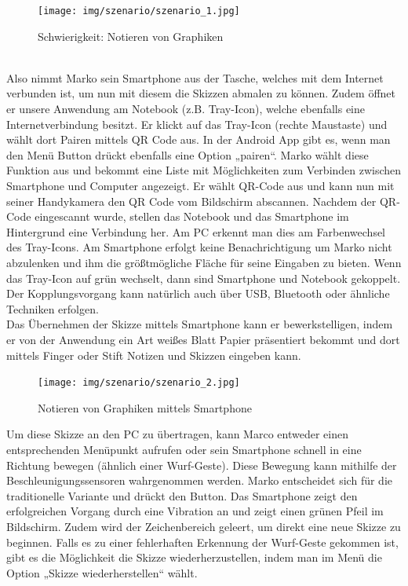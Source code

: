 \documentclass{chi-ext}
\begin{document}
\begin{figure}
  \centering
  \texttt{[image: img/szenario/szenario\_1.jpg]}
  \caption{Schwierigkeit: Notieren von Graphiken}
  \label{fig:mockup_startscreen}
\end{figure}
\ \\[3em]
Also nimmt Marko sein Smartphone aus der Tasche, welches mit dem Internet verbunden ist, um nun mit diesem die Skizzen abmalen zu können. Zudem öffnet er unsere Anwendung am Notebook (z.B. Tray-Icon), welche ebenfalls eine Internetverbindung besitzt. Er klickt auf das Tray-Icon (rechte Maustaste) und wählt dort Pairen mittels QR Code aus. In der Android App gibt es, wenn man den Menü Button drückt ebenfalls eine Option „pairen“. Marko wählt diese Funktion aus und bekommt eine Liste mit Möglichkeiten zum Verbinden zwischen Smartphone und Computer angezeigt. Er wählt QR-Code aus und kann nun mit seiner Handykamera den QR Code vom Bildschirm abscannen. Nachdem der QR-Code eingescannt wurde, stellen das Notebook und das Smartphone im Hintergrund eine Verbindung her. Am PC erkennt man dies am Farbenwechsel des Tray-Icons. Am Smartphone erfolgt keine Benachrichtigung um Marko nicht abzulenken und ihm die größtmögliche Fläche für seine Eingaben zu bieten. Wenn das Tray-Icon auf grün wechselt, dann sind Smartphone und Notebook gekoppelt. Der Kopplungsvorgang kann natürlich auch über USB, Bluetooth oder ähnliche Techniken erfolgen.\\
Das Übernehmen der Skizze mittels Smartphone kann er bewerkstelligen, indem er von der Anwendung ein Art weißes Blatt Papier präsentiert bekommt und dort mittels Finger oder Stift Notizen und Skizzen eingeben kann.

\begin{figure}
  \centering
  \texttt{[image: img/szenario/szenario\_2.jpg]}
  \caption{Notieren von Graphiken mittels Smartphone}
  \label{fig:mockup_startscreen}
\end{figure}

Um diese Skizze an den PC zu übertragen, kann Marco entweder einen entsprechenden Menüpunkt aufrufen oder sein Smartphone schnell in eine Richtung bewegen (ähnlich einer Wurf-Geste). Diese Bewegung kann mithilfe der Beschleunigungssensoren wahrgenommen werden. Marko entscheidet sich für die traditionelle Variante und drückt den Button.
Das Smartphone zeigt den erfolgreichen Vorgang durch eine Vibration an und zeigt einen grünen Pfeil im Bildschirm. Zudem wird der Zeichenbereich geleert, um direkt eine neue Skizze zu beginnen. Falls es zu einer fehlerhaften Erkennung der Wurf-Geste gekommen ist, gibt es die Möglichkeit die Skizze wiederherzustellen, indem man im Menü die Option „Skizze wiederherstellen“ wählt.
\end{document}
